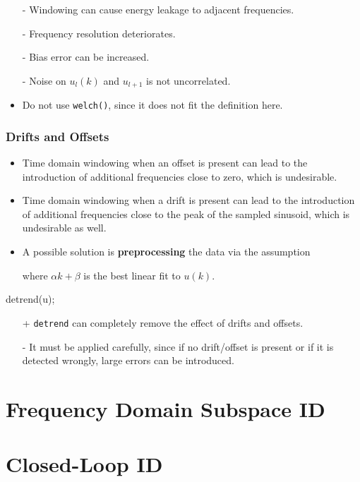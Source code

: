 \documentclass[10pt,a4paper]{scrartcl}
\begin{document}
\begin{multicols*}{2}
\begin{itemize}
\item[-] Windowing can cause energy leakage to adjacent frequencies.
\item[-] Frequency resolution deteriorates.
\item[-] Bias error can be increased.
\item[-] Noise on $u_l(k)$ and $u_{l+1}$ is not uncorrelated.
\item Do not use \verb+welch()+, since it does not fit the definition here.
\end{itemize}

\subsubsection{Drifts and Offsets}

\begin{itemize}
\item Time domain windowing when an offset is present can lead to the introduction of additional frequencies close to zero, which is undesirable.
\item Time domain windowing when a drift is present can lead to the introduction of additional frequencies close to the peak of the sampled sinusoid, which is undesirable as well.
\item A possible solution is \textbf{preprocessing} the data via the assumption


where $\alpha k+\beta$ is the best linear fit to $u(k)$.
\end{itemize}

\begin{TPMatlab}
detrend(u);
\end{TPMatlab}

\begin{itemize}
\item[+] \verb+detrend+ can completely remove the effect of drifts and offsets.
\item[-] It must be applied carefully, since if no drift/offset is present or if it is detected wrongly, large errors can be introduced.
\end{itemize}

\section{Frequency Domain Subspace ID}

\section{Closed-Loop ID}


\end{multicols*}
\end{document}
